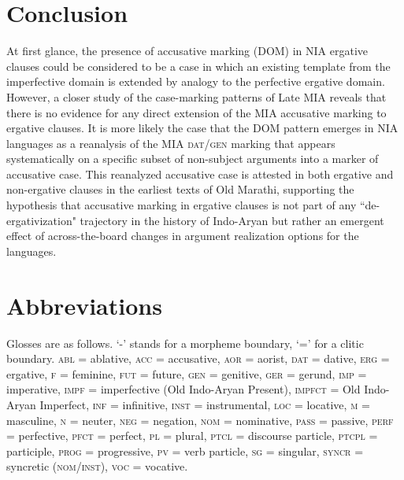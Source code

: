 \documentclass[output=paper,
modfonts
]{LSP/langsci}
\begin{document}
 \section{Conclusion}
At first glance, the presence of accusative marking (DOM)  in NIA ergative clauses could  be considered to be a case in  which  an existing template from the imperfective domain is extended by analogy to the perfective ergative domain. However, a closer study of the case-marking patterns of Late MIA reveals that there is no evidence for any direct  extension of the MIA accusative marking to ergative clauses. It is more likely the case that the DOM pattern emerges in NIA languages as a reanalysis of the MIA \textsc{dat/gen} marking that appears systematically  on a specific  subset of  non-subject arguments into a marker of  accusative case. This reanalyzed accusative case is attested in  both ergative and non-ergative clauses in the earliest texts of Old Marathi,  supporting the hypothesis that accusative marking in ergative clauses  is not part of any ``de-ergativization" trajectory 
 in the history of Indo-Aryan  but rather an emergent effect of across-the-board changes in argument realization options for the languages. 
 



\nocite{anderson77, moravcsik1978, condoravdideo14, deo2012, coonpreminger, dixon79, dixon94, plank79ed, delancey1981, tsunoda1985, andersen86, peterson98, pischel00, bubenik98, bubenik96, bloch65, Vale48, masica91, declercq2010, comrie78, anderson2004}



\section*{Abbreviations}
Glosses are as follows.  `-' stands
  for a   morpheme boundary, `=' for a clitic boundary. \textsc{abl} = ablative,
  \textsc{acc} = accusative, \textsc{aor} = aorist, \textsc{dat} = dative, \textsc{erg} = ergative, \textsc{f} = feminine, \textsc{fut} = future, \textsc{gen}
  = genitive, \textsc{ger} = gerund, \textsc{imp} = imperative, \textsc{impf} =
  imperfective (Old Indo-Aryan Present), \textsc{impfct} = Old Indo-Aryan Imperfect, \textsc{inf} = infinitive, \textsc{inst} = instrumental, \textsc{loc} = locative, \textsc{m} = masculine, \textsc{n} = neuter, \textsc{neg}
  = negation, \textsc{nom} = nominative, \textsc{pass} = passive, \textsc{perf}
  = perfective, \textsc{pfct} = perfect, \textsc{pl} = plural, \textsc{ptcl} = discourse
  particle, \textsc{ptcpl} = participle, \textsc{prog} = progressive, \textsc{pv} = verb particle, \textsc{sg} = singular, \textsc{syncr} = syncretic (\textsc{nom/inst}),
  \textsc{voc} = vocative.



\printbibliography[heading=subbibliography,notkeyword=this]
\end{document}
